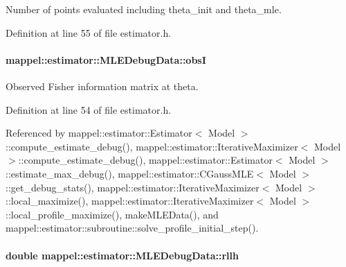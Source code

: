 Number of points evaluated including theta\+\_\+init and theta\+\_\+mle. 



Definition at line 55 of file estimator.\+h.

\paragraph[{\texorpdfstring{obsI}{obsI}}]{ mappel\+::estimator\+::\+M\+L\+E\+Debug\+Data\+::obsI}\hypertarget{structmappel_1_1estimator_1_1MLEDebugData_a6fadb423b602a1f671c8d6f211663fcc}{}\label{structmappel_1_1estimator_1_1MLEDebugData_a6fadb423b602a1f671c8d6f211663fcc}


Observed Fisher information matrix at theta. 



Definition at line 54 of file estimator.\+h.



Referenced by mappel\+::estimator\+::\+Estimator$<$ Model $>$\+::compute\+\_\+estimate\+\_\+debug(), mappel\+::estimator\+::\+Iterative\+Maximizer$<$ Model $>$\+::compute\+\_\+estimate\+\_\+debug(), mappel\+::estimator\+::\+Estimator$<$ Model $>$\+::estimate\+\_\+max\+\_\+debug(), mappel\+::estimator\+::\+C\+Gauss\+M\+L\+E$<$ Model $>$\+::get\+\_\+debug\+\_\+stats(), mappel\+::estimator\+::\+Iterative\+Maximizer$<$ Model $>$\+::local\+\_\+maximize(), mappel\+::estimator\+::\+Iterative\+Maximizer$<$ Model $>$\+::local\+\_\+profile\+\_\+maximize(), make\+M\+L\+E\+Data(), and mappel\+::estimator\+::subroutine\+::solve\+\_\+profile\+\_\+initial\+\_\+step().

\paragraph[{\texorpdfstring{rllh}{rllh}}]{\setlength{\rightskip}{0pt plus 5cm}double mappel\+::estimator\+::\+M\+L\+E\+Debug\+Data\+::rllh}\hypertarget{structmappel_1_1estimator_1_1MLEDebugData_a6dea52884caeb6e2957d4242ea568e77}{}\label{structmappel_1_1estimator_1_1MLEDebugData_a6dea52884caeb6e2957d4242ea568e77}



